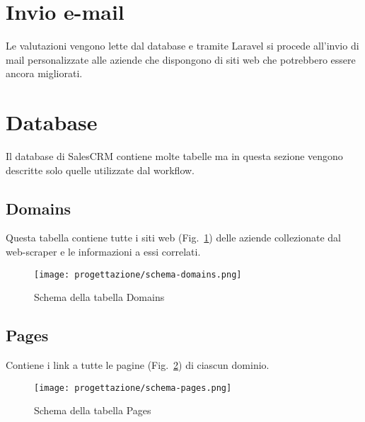 \section{Invio e-mail}
Le valutazioni vengono lette dal database e tramite Laravel si procede all'invio di mail personalizzate alle aziende che dispongono di siti web che potrebbero essere ancora migliorati.

\section{Database}
Il database di SalesCRM contiene molte tabelle ma in questa sezione vengono descritte solo quelle utilizzate dal workflow.

\subsection{Domains}
Questa tabella contiene tutte i siti web (Fig.~\ref{fig:schema-domains}) delle aziende collezionate dal web-scraper e le informazioni a essi correlati.


\begin{figure}[!h] 
  \centering 
  \texttt{[image: progettazione/schema-domains.png]} 
  \caption{Schema della tabella Domains}
  \label{fig:schema-domains}
\end{figure}


\subsection{Pages}
Contiene i link a tutte le pagine (Fig.~\ref{fig:schema-pages}) di ciascun dominio.

\begin{figure}[!h] 
  \centering 
  \texttt{[image: progettazione/schema-pages.png]} 
  \caption{Schema della tabella Pages}
  \label{fig:schema-pages}
\end{figure}
